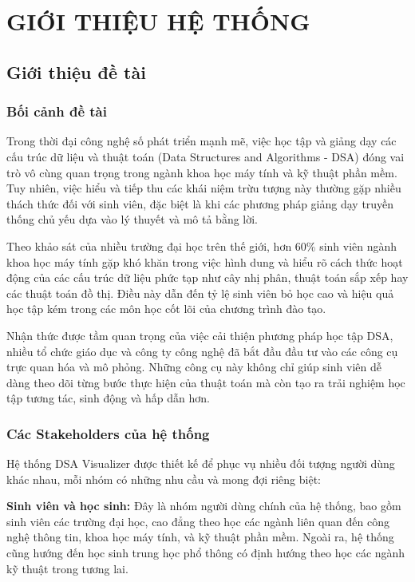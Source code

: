 \chapter{GIỚI THIỆU HỆ THỐNG}
\label{ch:introduction}

\section{Giới thiệu đề tài}
\label{sec:intro-topic}

\subsection{Bối cảnh đề tài}
\label{subsec:context}

Trong thời đại công nghệ số phát triển mạnh mẽ, việc học tập và giảng dạy các cấu trúc dữ liệu và thuật toán (Data Structures and Algorithms - DSA) đóng vai trò vô cùng quan trọng trong ngành khoa học máy tính và kỹ thuật phần mềm. Tuy nhiên, việc hiểu và tiếp thu các khái niệm trừu tượng này thường gặp nhiều thách thức đối với sinh viên, đặc biệt là khi các phương pháp giảng dạy truyền thống chủ yếu dựa vào lý thuyết và mô tả bằng lời.

Theo khảo sát của nhiều trường đại học trên thế giới, hơn 60\% sinh viên ngành khoa học máy tính gặp khó khăn trong việc hình dung và hiểu rõ cách thức hoạt động của các cấu trúc dữ liệu phức tạp như cây nhị phân, thuật toán sắp xếp hay các thuật toán đồ thị. Điều này dẫn đến tỷ lệ sinh viên bỏ học cao và hiệu quả học tập kém trong các môn học cốt lõi của chương trình đào tạo.

Nhận thức được tầm quan trọng của việc cải thiện phương pháp học tập DSA, nhiều tổ chức giáo dục và công ty công nghệ đã bắt đầu đầu tư vào các công cụ trực quan hóa và mô phỏng. Những công cụ này không chỉ giúp sinh viên dễ dàng theo dõi từng bước thực hiện của thuật toán mà còn tạo ra trải nghiệm học tập tương tác, sinh động và hấp dẫn hơn.

\subsection{Các Stakeholders của hệ thống}
\label{subsec:stakeholders}

Hệ thống DSA Visualizer được thiết kế để phục vụ nhiều đối tượng người dùng khác nhau, mỗi nhóm có những nhu cầu và mong đợi riêng biệt:

\textbf{Sinh viên và học sinh:} Đây là nhóm người dùng chính của hệ thống, bao gồm sinh viên các trường đại học, cao đẳng theo học các ngành liên quan đến công nghệ thông tin, khoa học máy tính, và kỹ thuật phần mềm. Ngoài ra, hệ thống cũng hướng đến học sinh trung học phổ thông có định hướng theo học các ngành kỹ thuật trong tương lai.

